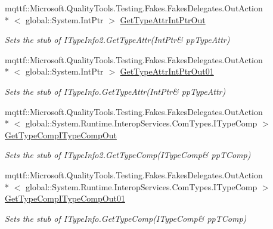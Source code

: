 \begin{DoxyCompactItemize}
mqttf\-::\-Microsoft.\-Quality\-Tools.\-Testing.\-Fakes.\-Fakes\-Delegates.\-Out\-Action\\*
$<$ global\-::\-System.\-Int\-Ptr $>$ \hyperlink{class_system_1_1_runtime_1_1_interop_services_1_1_com_types_1_1_fakes_1_1_stub_i_type_info2_a3e85ae173aebec2e32b4145b6021851b}{Get\-Type\-Attr\-Int\-Ptr\-Out}
\begin{DoxyCompactList}\small\item\em Sets the stub of I\-Type\-Info2.\-Get\-Type\-Attr(Int\-Ptr\& pp\-Type\-Attr)\end{DoxyCompactList}\item 
mqttf\-::\-Microsoft.\-Quality\-Tools.\-Testing.\-Fakes.\-Fakes\-Delegates.\-Out\-Action\\*
$<$ global\-::\-System.\-Int\-Ptr $>$ \hyperlink{class_system_1_1_runtime_1_1_interop_services_1_1_com_types_1_1_fakes_1_1_stub_i_type_info2_a5d55ce1fa9d3aba99d512b04d0b24fd5}{Get\-Type\-Attr\-Int\-Ptr\-Out01}
\begin{DoxyCompactList}\small\item\em Sets the stub of I\-Type\-Info.\-Get\-Type\-Attr(Int\-Ptr\& pp\-Type\-Attr)\end{DoxyCompactList}\item 
mqttf\-::\-Microsoft.\-Quality\-Tools.\-Testing.\-Fakes.\-Fakes\-Delegates.\-Out\-Action\\*
$<$ global\-::\-System.\-Runtime.\-Interop\-Services.\-Com\-Types.\-I\-Type\-Comp $>$ \hyperlink{class_system_1_1_runtime_1_1_interop_services_1_1_com_types_1_1_fakes_1_1_stub_i_type_info2_adba3cf186ce911493bd9761ed5d210c3}{Get\-Type\-Comp\-I\-Type\-Comp\-Out}
\begin{DoxyCompactList}\small\item\em Sets the stub of I\-Type\-Info2.\-Get\-Type\-Comp(I\-Type\-Comp\& pp\-T\-Comp)\end{DoxyCompactList}\item 
mqttf\-::\-Microsoft.\-Quality\-Tools.\-Testing.\-Fakes.\-Fakes\-Delegates.\-Out\-Action\\*
$<$ global\-::\-System.\-Runtime.\-Interop\-Services.\-Com\-Types.\-I\-Type\-Comp $>$ \hyperlink{class_system_1_1_runtime_1_1_interop_services_1_1_com_types_1_1_fakes_1_1_stub_i_type_info2_a319bedd5159ea8d0b06458d27924cff7}{Get\-Type\-Comp\-I\-Type\-Comp\-Out01}
\begin{DoxyCompactList}\small\item\em Sets the stub of I\-Type\-Info.\-Get\-Type\-Comp(I\-Type\-Comp\& pp\-T\-Comp)\end{DoxyCompactList}\item 

\end{DoxyCompactItemize}

